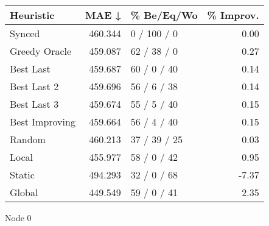 \begin{tabular}{lrlr}
\toprule
\textbf{Heuristic} & \textbf{MAE ↓} & \textbf{\% Be/Eq/Wo} & \textbf{\% Improv.} \\
\midrule
            Synced &        460.344 &          0 / 100 / 0 &                0.00 \\
     Greedy Oracle &        459.087 &          62 / 38 / 0 &                0.27 \\
         Best Last &        459.687 &          60 / 0 / 40 &                0.14 \\
       Best Last 2 &        459.696 &          56 / 6 / 38 &                0.14 \\
       Best Last 3 &        459.674 &          55 / 5 / 40 &                0.15 \\
    Best Improving &        459.664 &          56 / 4 / 40 &                0.15 \\
            Random &        460.213 &         37 / 39 / 25 &                0.03 \\
             Local &        455.977 &          58 / 0 / 42 &                0.95 \\
            Static &        494.293 &          32 / 0 / 68 &               -7.37 \\
            Global &        449.549 &          59 / 0 / 41 &                2.35 \\
\bottomrule
\end{tabular}
\caption{Node 0}
\label{tab:non_lr01_le1_bs2_0}
